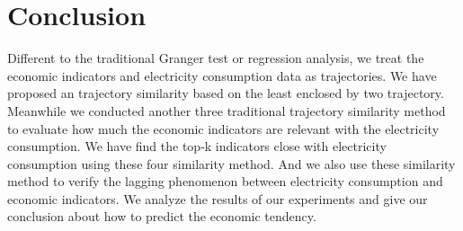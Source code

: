 
\section{Conclusion}
Different to the traditional Granger test or regression analysis, we treat the economic indicators and electricity consumption data as trajectories. We have proposed an trajectory similarity based on the least enclosed by two trajectory. Meanwhile we conducted another three traditional trajectory similarity method to evaluate how much the economic indicators are relevant with the electricity consumption. We have find the top-k indicators close with electricity consumption using these four similarity method. And we also use these similarity method to verify the lagging phenomenon between electricity consumption and economic indicators. We analyze the results of our experiments and give our conclusion about how to predict the economic tendency. 